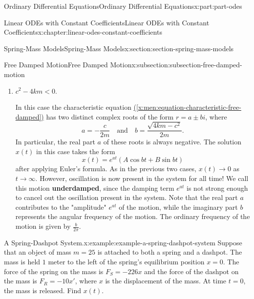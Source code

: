 \documentclass[oneside,10pt,]{book}
\newcommand{\xreffont}{\relax}
\newcommand{\terminology}[1]{\textbf{#1}}
\numberwithin{equation}{part}
\newcommand{\lt}{<}
\begin{document}
\begin{partptx}{Ordinary Differential Equations}{}{Ordinary Differential Equations}{}{}{x:part:part-odes}
\begin{chapterptx}{Linear ODEs with Constant Coefficients}{}{Linear ODEs with Constant Coefficients}{}{}{x:chapter:linear-odes-constant-coefficients}
\begin{sectionptx}{Spring-Mass Models}{}{Spring-Mass Models}{}{}{x:section:section-spring-mass-models}
\begin{subsectionptx}{Free Damped Motion}{}{Free Damped Motion}{}{}{x:subsection:subsection-free-damped-motion}
\begin{enumerate}[label=\arabic*:]
In this case, the characteristic equation \hyperref[x:men:equation-characteristic-free-damped]{({\xreffont\ref{x:men:equation-characteristic-free-damped}})} has a repeated (real) root, and so the solution \(x(t)\) takes the form%
\begin{equation*}
x(t) = e^{r_{1}t}(c_{1} + c_{2}t).
\end{equation*}
This mass can pass through \(x = 0\) only once, at \(t = -\frac{c_{1}}{c_{2}}\). Once it does, the mass will "turn around" soon afterwards and beginning moving back to \(0\), as in the first case. We call this type of motion \terminology{critically damped}, since it's right on the border between overdamped motion and oscillating motion.%
\item{}\(c^{2} - 4km \lt 0\).%
\par
In this case the characteristic equation \hyperref[x:men:equation-characteristic-free-damped]{({\xreffont\ref{x:men:equation-characteristic-free-damped}})} has two distinct complex roots of the form \(r = a \pm bi\), where%
\begin{equation*}
a = -\frac{c}{2m}\quad\text{and}\quad b = \frac{\sqrt{4km - c^{2}}}{2m}.
\end{equation*}
In particular, the real part \(a\) of these roots is always negative. The solution \(x(t)\) in this case takes the form%
\begin{equation*}
x(t) = e^{at}(A\cos bt + B\sin bt)
\end{equation*}
after applying Euler's formula. As in the previous two cases, \(x(t)\to0\) as \(t\to\infty\). However, oscillation is now present in the system for all time! We call this motion \terminology{underdamped}, since the damping term \(e^{at}\) is not strong enough to cancel out the oscillation present in the system. Note that the real part \(a\) contributes to the "amplitude" \(e^{at}\) of the motion, while the imaginary part \(b\) represents the angular frequency of the motion. The ordinary frequency of the motion is given by \(\frac{b}{2\pi}\).%
\end{enumerate}
\begin{example}{A Spring-Dashpot System.}{x:example:example-a-spring-dashpot-system}%
Suppose that an object of mass \(m = 25\) is attached to both a spring and a dashpot. The mass is held \(1\) meter to the left of the spring's equilibrium position \(x = 0\). The force of the spring on the mass is \(F_{S} = -226x\) and the force of the dashpot on the mass is \(F_{R} = -10x'\), where \(x\) is the displacement of the mass. At time \(t = 0\), the mass is released. Find \(x(t)\).%

\end{example}
\end{subsectionptx}
\end{sectionptx}
\end{chapterptx}
\end{partptx}
\end{document}
